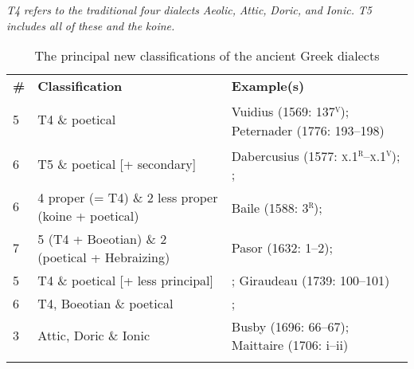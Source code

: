 \begin{table}
\caption{The principal new classifications of the ancient Greek dialects}
 

\textit{T4} \textit{refers} \textit{to} \textit{the} \textit{traditional} \textit{four} \textit{dialects} \textit{Aeolic,} \textit{Attic,} \textit{Doric,} \textit{and} \textit{Ionic.} \textit{T5} \textit{includes} \textit{all} \textit{of} \textit{these} \textit{and} \textit{the} \textit{koine.}

 
\begin{tabularx}{\textwidth}{XXX}
\lsptoprule

 \textbf{\#} & \textbf{Classification} & \textbf{Example(s)}\\
 5 & T4 \& poetical & Vuidius (1569: 137\textsc{\textsuperscript{v}}); Peternader (1776: 193–198)\\
 6 & T5 \& poetical [+ secondary] & Dabercusius (1577: \textsc{x.1}\textsc{\textsuperscript{r}}\textsc{–x.1}\textsc{\textsuperscript{v}}); \citet[334]{Alsted1630}; \citet[64]{Bregius1684}\\
 6 & 4 proper (= T4) \& 2 less proper (koine + poetical) & Baile (1588: 3\textsc{\textsuperscript{r}}); \citet[4]{Schmidt1604}\\
 7 & 5 (T4 + Boeotian) \& 2 (poetical + Hebraizing) & Pasor (1632: 1–2); \citet[3]{Wyss1650}\\
 5 & T4 \& poetical [+ less principal] & \citet[302]{Opitz1687}; Giraudeau (1739: 100–101)\\
 6 & T4, Boeotian \& poetical & \citet[48]{Wright1691}; \citet[121]{Holmes1735}\\
 3 & Attic, Doric \& Ionic & Busby (1696: 66–67); Maittaire (1706: i–ii)\\
\lspbottomrule
\end{tabularx}
\end{table}

